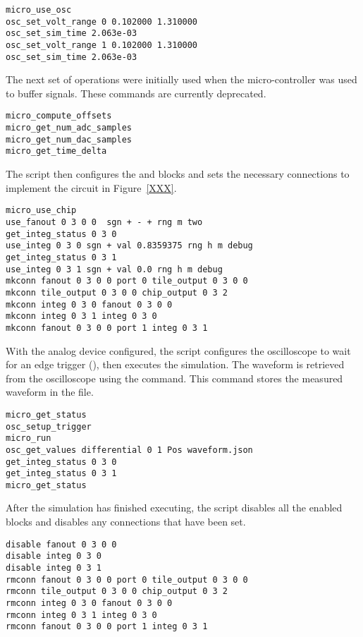 \begin{lstlisting}
micro_use_osc
osc_set_volt_range 0 0.102000 1.310000
osc_set_sim_time 2.063e-03
osc_set_volt_range 1 0.102000 1.310000
osc_set_sim_time 2.063e-03
\end{lstlisting}

The next set of operations were initially used when the micro-controller was used
to buffer signals. These commands are currently deprecated.

\begin{lstlisting}
micro_compute_offsets
micro_get_num_adc_samples
micro_get_num_dac_samples
micro_get_time_delta
\end{lstlisting}

The \grendel script then configures the  and  blocks and
sets the necessary connections to implement the circuit in Figure~\ref{XXX}.

\begin{lstlisting}
micro_use_chip
use_fanout 0 3 0 0  sgn + - + rng m two
get_integ_status 0 3 0
use_integ 0 3 0 sgn + val 0.8359375 rng h m debug
get_integ_status 0 3 1
use_integ 0 3 1 sgn + val 0.0 rng h m debug
mkconn fanout 0 3 0 0 port 0 tile_output 0 3 0 0
mkconn tile_output 0 3 0 0 chip_output 0 3 2
mkconn integ 0 3 0 fanout 0 3 0 0
mkconn integ 0 3 1 integ 0 3 0
mkconn fanout 0 3 0 0 port 1 integ 0 3 1
\end{lstlisting}

With the analog device configured, the \grendel script configures the
oscilloscope to wait for an edge trigger (), then executes
the simulation. The waveform is retrieved from the oscilloscope using the
 command. This command stores the measured waveform in the
 file.

\begin{lstlisting}
micro_get_status
osc_setup_trigger
micro_run
osc_get_values differential 0 1 Pos waveform.json
get_integ_status 0 3 0
get_integ_status 0 3 1
micro_get_status
\end{lstlisting}

After the simulation has finished executing, the \grendel script disables all
the enabled blocks and disables any connections that have been set. 

\begin{lstlisting}
disable fanout 0 3 0 0
disable integ 0 3 0
disable integ 0 3 1
rmconn fanout 0 3 0 0 port 0 tile_output 0 3 0 0
rmconn tile_output 0 3 0 0 chip_output 0 3 2
rmconn integ 0 3 0 fanout 0 3 0 0
rmconn integ 0 3 1 integ 0 3 0
rmconn fanout 0 3 0 0 port 1 integ 0 3 1
\end{lstlisting}

